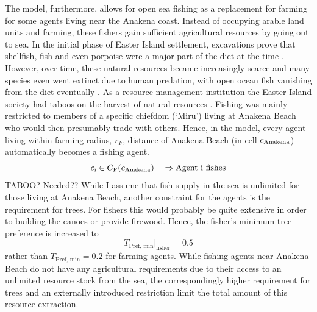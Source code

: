 The model, furthermore, allows for open sea fishing as a replacement for farming for some agents living near the Anakena coast.
Instead of occupying arable land units and farming, these fishers gain sufficient agricultural resources by going out to sea.
In the initial phase of Easter Island settlement, excavations prove that shellfish, fish and even porpoise were a major part of the diet at the time \citep{Bahn2017}.
However, over time, these natural resources became increasingly scarce and many species even went extinct due to human predation, with open ocean fish vanishing from the diet eventually \citep{Diamond2011}.
As a resource management institution the Easter Island society had taboos on the harvest of natural resources \citep{Good2006}. 
Fishing was mainly restricted to members of a specific chiefdom (`Miru') living at Anakena Beach \citep{Bahn2017} who would then presumably trade with others.
Hence, in the model, every agent living within farming radius, $r_F$, distance of Anakena Beach (in cell $c_{\rm Anakena}$) automatically becomes a fishing agent.
\begin{equation}
 	c_{\rm i} \in C_{\rm F}(c_{\rm Anakena}) \quad \Rightarrow \text{Agent i  fishes}
\end{equation}
\TODO TABOO? Needed??
While I assume that fish supply in the sea is unlimited for those living at Anakena Beach, another constraint for the agents is the requirement for trees.
For fishers this would probably be quite extensive in order to building the canoes or provide firewood. 
Hence, the fisher's minimum tree preference is increased to
\begin{equation}
T_\text{Pref, min}|_\text{fisher} = 0.5
\end{equation} 
rather than $T_\text{Pref, min} = 0.2$ for farming agents.
While fishing agents near Anakena Beach do not have any agricultural requirements due to their access to an unlimited resource stock from the sea, the correspondingly higher requirement for trees and an externally introduced restriction limit the total amount of this resource extraction.

